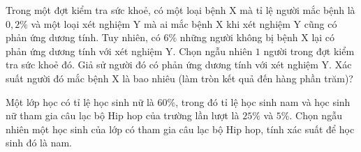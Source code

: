 \begin{bt}%
	Trong một đợt kiểm tra sức khoẻ, có một loại bệnh X mà tỉ lệ người mắc bệnh là $0{,}2\% $ và một loại xét nghiệm Y mà ai mắc bệnh X khi xét nghiệm Y cũng có phản ứng dương tính. Tuy nhiên, có $6\% $ những người không bị bệnh X lại có phản ứng dương tính với xét nghiệm Y. Chọn ngẫu nhiên $1$ người trong đợt kiểm tra sức khoẻ đó. Giả sử người đó có phản ứng dương tính với xét nghiệm Y. Xác suất người đó mắc bệnh X là bao nhiêu (làm tròn kết quả đến hàng phần  trăm)?
\end{bt}

\begin{bt}%
	Một lớp học có tỉ lệ học sinh nữ là $60\%$, trong đó tỉ lệ học sinh nam và học sinh nữ tham gia câu lạc bộ Hip hop của trường lần lượt là $25\%$ và $5\%$. Chọn ngẫu nhiên một học sinh của lớp có tham gia câu lạc bộ Hip hop, tính  xác suất để học sinh đó là nam.
\end{bt}

